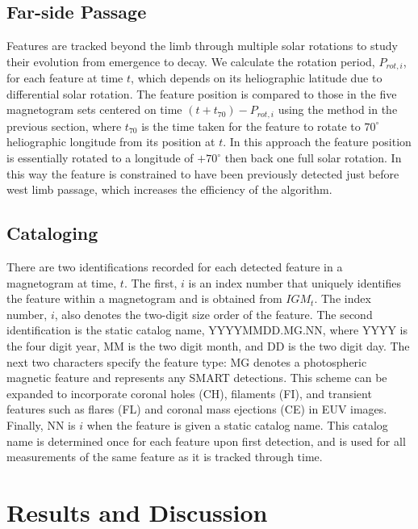 \subsection{Far-side Passage}\label{history2}

Features are tracked beyond the limb through multiple solar rotations to study their evolution from emergence to decay. We calculate the rotation period, $P_{rot,i}$, for each feature at time $t$, which depends on its heliographic latitude due to differential solar rotation. The feature position is compared to those in the five magnetogram sets centered on time $(t+t_{70})-P_{rot,i}$ using the method in the previous section, where $t_{70}$ is the time taken for the feature to rotate to $70^{\circ}$ heliographic longitude from its position at $t$. In this approach the feature position is essentially rotated to a longitude of $+70^{\circ}$ then back one full solar rotation. In this way the feature is constrained to have been previously detected just before west limb passage, which increases the efficiency of the algorithm.

\subsection{Cataloging}\label{cataloging}

There are two identifications recorded for each detected feature in a magnetogram at time, $t$. The first, $i$ is an index number that uniquely identifies the feature within a magnetogram and is obtained from $IGM_{t}$. The index number, $i$, also denotes the two-digit size order of the feature. The second identification is the static catalog name, YYYYMMDD.MG.NN, where YYYY is the four digit year, MM is the two digit month, and DD is the two digit day. The next two characters specify the feature type: MG denotes a photospheric magnetic feature and represents any SMART detections. This scheme can be expanded to incorporate coronal holes (CH), filaments (FI), and transient features such as flares (FL) and coronal mass ejections (CE) in EUV images. Finally, NN is $i$ when the feature is given a static catalog name. This catalog name is determined once for each feature upon first detection, and is used for all measurements of the same feature as it is tracked through time. 


\section{Results and Discussion}\label{sect:smartresults}

